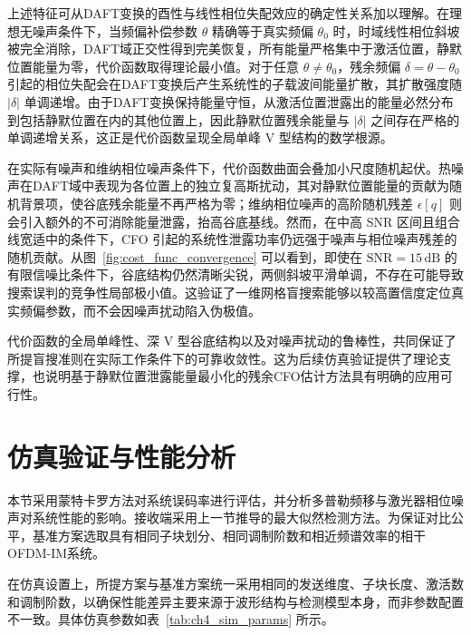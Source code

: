 上述特征可从DAFT变换的酉性与线性相位失配效应的确定性关系加以理解。在理想无噪声条件下，当频偏补偿参数 $\theta$ 精确等于真实频偏 $\theta_0$ 时，时域线性相位斜坡被完全消除，DAFT域正交性得到完美恢复，所有能量严格集中于激活位置，静默位置能量为零，代价函数取得理论最小值。对于任意 $\theta \neq \theta_0$，残余频偏 $\delta = \theta - \theta_0$ 引起的相位失配会在DAFT变换后产生系统性的子载波间能量扩散，其扩散强度随 $|\delta|$ 单调递增。由于DAFT变换保持能量守恒，从激活位置泄露出的能量必然分布到包括静默位置在内的其他位置上，因此静默位置残余能量与 $|\delta|$ 之间存在严格的单调递增关系，这正是代价函数呈现全局单峰 V 型结构的数学根源。

在实际有噪声和维纳相位噪声条件下，代价函数曲面会叠加小尺度随机起伏。热噪声在DAFT域中表现为各位置上的独立复高斯扰动，其对静默位置能量的贡献为随机背景项，使谷底残余能量不再严格为零；维纳相位噪声的高阶随机残差 $\epsilon[q]$ 则会引入额外的不可消除能量泄露，抬高谷底基线。然而，在中高 SNR 区间且组合线宽适中的条件下，CFO 引起的系统性泄露功率仍远强于噪声与相位噪声残差的随机贡献。从图~\ref{fig:cost_func_convergence} 可以看到，即使在 $\mathrm{SNR}=15\,\mathrm{dB}$ 的有限信噪比条件下，谷底结构仍然清晰尖锐，两侧斜坡平滑单调，不存在可能导致搜索误判的竞争性局部极小值。这验证了一维网格盲搜索能够以较高置信度定位真实频偏参数，而不会因噪声扰动陷入伪极值。

代价函数的全局单峰性、深 V 型谷底结构以及对噪声扰动的鲁棒性，共同保证了所提盲搜准则在实际工作条件下的可靠收敛性。这为后续仿真验证提供了理论支撑，也说明基于静默位置泄露能量最小化的残余CFO估计方法具有明确的应用可行性。

\section{仿真验证与性能分析}
\label{sec:coherent_afdm_im_sim}

本节采用蒙特卡罗方法对系统误码率进行评估，并分析多普勒频移与激光器相位噪声对系统性能的影响。接收端采用上一节推导的最大似然检测方法。为保证对比公平，基准方案选取具有相同子块划分、相同调制阶数和相近频谱效率的相干OFDM-IM系统。

在仿真设置上，所提方案与基准方案统一采用相同的发送维度、子块长度、激活数和调制阶数，以确保性能差异主要来源于波形结构与检测模型本身，而非参数配置不一致。具体仿真参数如表~\ref{tab:ch4_sim_params} 所示。

